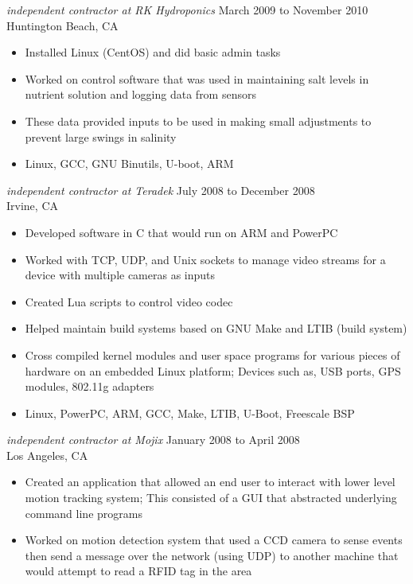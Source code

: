 \documentclass{res}
\begin{document}
\begin{resume}
{\sl independent contractor at RK Hydroponics} \hfill March 2009 to November 2010\\
Huntington Beach, CA 
\begin{itemize}
\item Installed Linux (CentOS) and did basic admin tasks
\item Worked on control software that was used in maintaining salt
levels in nutrient solution and logging data from sensors
\item These data provided inputs to be used in making small adjustments
to prevent large swings in salinity
\item Linux, GCC, GNU Binutils, U-boot, ARM
\end{itemize}


{\sl independent contractor at Teradek} \hfill July 2008 to December 2008\\
Irvine, CA
\begin{itemize}
\item Developed software in C that would run on ARM and PowerPC
\item Worked with TCP, UDP, and Unix sockets to manage video streams for
a device with multiple cameras as inputs
\item Created Lua scripts to control video codec
\item Helped maintain build systems based on GNU Make and LTIB (build system)
\item Cross compiled kernel modules and user space programs for various
pieces of hardware on an embedded Linux platform; Devices such as, USB
ports, GPS modules, 802.11g adapters
\item  Linux, PowerPC, ARM, GCC, Make, LTIB, U-Boot, Freescale BSP
\end{itemize}

{\sl independent contractor at Mojix} \hfill January 2008 to April 2008\\
Los Angeles, CA
\begin{itemize}

\item Created an application that allowed an end user to interact
with lower level motion tracking system; This consisted of a GUI
that abstracted underlying command line programs

\item Worked on  motion detection system that used a CCD camera to sense
events then send a message over the network (using UDP) to another
machine that would attempt to read a RFID tag in the area


\end{itemize}
\end{resume}
\end{document}
